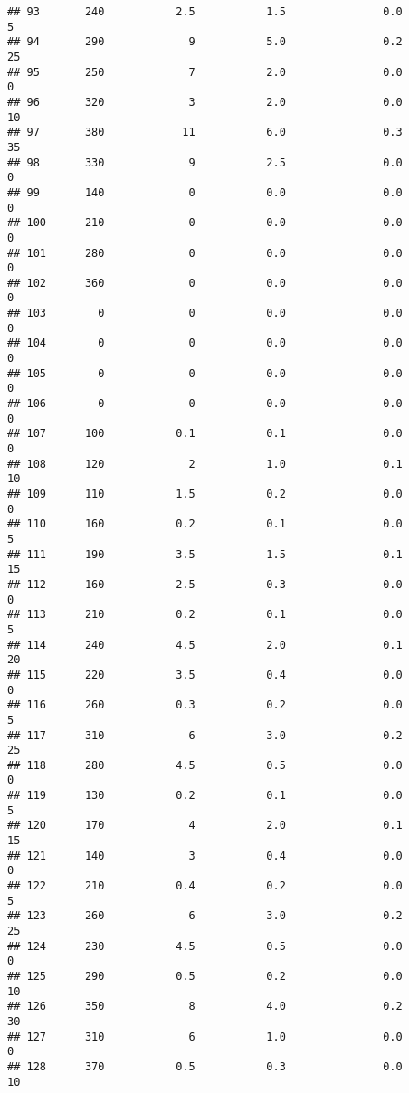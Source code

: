 \documentclass[
]{article}
\begin{document}
\begin{verbatim}
## 93       240           2.5           1.5               0.0           5
## 94       290             9           5.0               0.2          25
## 95       250             7           2.0               0.0           0
## 96       320             3           2.0               0.0          10
## 97       380            11           6.0               0.3          35
## 98       330             9           2.5               0.0           0
## 99       140             0           0.0               0.0           0
## 100      210             0           0.0               0.0           0
## 101      280             0           0.0               0.0           0
## 102      360             0           0.0               0.0           0
## 103        0             0           0.0               0.0           0
## 104        0             0           0.0               0.0           0
## 105        0             0           0.0               0.0           0
## 106        0             0           0.0               0.0           0
## 107      100           0.1           0.1               0.0           0
## 108      120             2           1.0               0.1          10
## 109      110           1.5           0.2               0.0           0
## 110      160           0.2           0.1               0.0           5
## 111      190           3.5           1.5               0.1          15
## 112      160           2.5           0.3               0.0           0
## 113      210           0.2           0.1               0.0           5
## 114      240           4.5           2.0               0.1          20
## 115      220           3.5           0.4               0.0           0
## 116      260           0.3           0.2               0.0           5
## 117      310             6           3.0               0.2          25
## 118      280           4.5           0.5               0.0           0
## 119      130           0.2           0.1               0.0           5
## 120      170             4           2.0               0.1          15
## 121      140             3           0.4               0.0           0
## 122      210           0.4           0.2               0.0           5
## 123      260             6           3.0               0.2          25
## 124      230           4.5           0.5               0.0           0
## 125      290           0.5           0.2               0.0          10
## 126      350             8           4.0               0.2          30
## 127      310             6           1.0               0.0           0
## 128      370           0.5           0.3               0.0          10

\end{verbatim}
\end{document}
